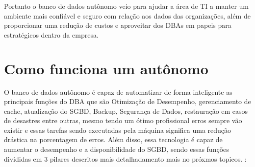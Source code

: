 Portanto o banco de dados autônomo veio para ajudar a área de TI a manter um ambiente mais confiável e seguro com relação aos dados das organizações, além de proporcionar uma redução de custos e aproveitar dos DBAs em papeis para estratégicos dentro da empresa.



\section{Como funciona um autônomo}

O banco de dados autônomo é capaz de automatizar de forma inteligente as principais funções do DBA que são Otimização de Desempenho, gerenciamento de cache, atualização do SGBD, Backup, Segurança de Dados, restauração em casos de desastres entre outras, mesmo tendo um ótimo profissional erros sempre vão existir e essas tarefas sendo executadas pela máquina significa uma redução drástica na porcentagem de erros. Além disso, essa tecnologia é capaz de aumentar o desempenho e a disponibilidade do SGBD, sendo essas funções divididas em 3 pilares descritos mais detalhadamento mais no próxmos topicos. \cite{OracleDBAutonomo}:

